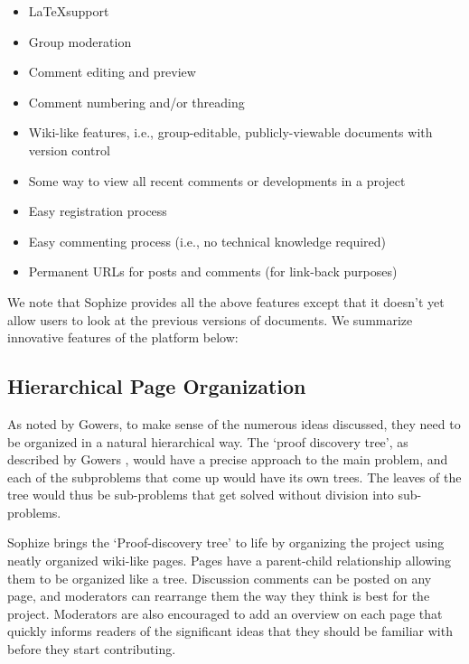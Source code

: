 \documentclass[a4paper]{article}
\begin{document}
\begin{itemize}

  \item \LaTeX\space support

  \item Group moderation

  \item Comment editing and preview

  \item Comment numbering and/or threading

  \item Wiki-like features, i.e., group-editable, publicly-viewable documents with version control

  \item Some way to view all recent comments or developments in a project

  \item Easy registration process

  \item Easy commenting process (i.e., no technical knowledge required)

  \item Permanent URLs for posts and comments (for link-back purposes)

\end{itemize}


We note that Sophize provides all the above features except that it doesn't yet allow users to look at the previous versions of documents. We summarize innovative features of the platform below:

\subsection{Hierarchical Page Organization}

As noted by Gowers, to make sense of the numerous ideas discussed, they need to be organized in a natural hierarchical way. The `proof discovery tree', as described by Gowers \cite{gowers_weblog_2009}, would have a precise approach to the main problem, and each of the subproblems that come up would have its own trees. The leaves of the tree would thus be sub-problems that get solved without division into sub-problems.

Sophize brings the `Proof-discovery tree' to life by organizing the project using neatly organized wiki-like pages. Pages have a parent-child relationship allowing them to be organized like a tree. Discussion comments can be posted on any page, and moderators can rearrange them the way they think is best for the project. Moderators are also encouraged to add an overview on each page that quickly informs readers of the significant ideas that they should be familiar with before they start contributing.
\end{document}
